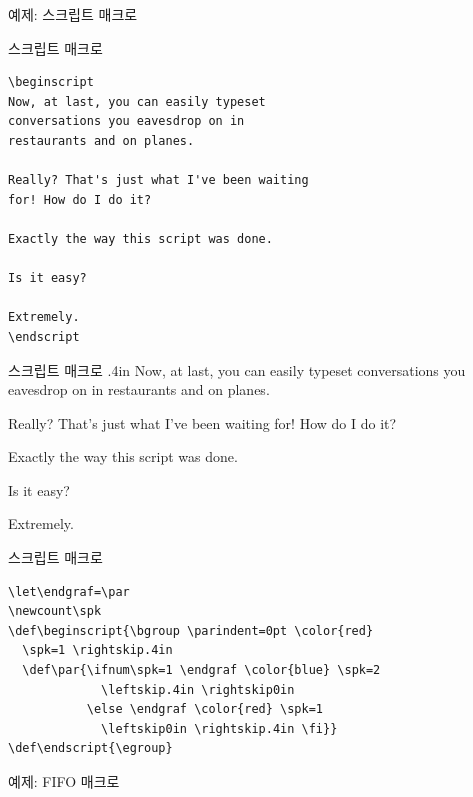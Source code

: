 \documentclass{beamer}
\begin{document}
%
\begin{frame}[standout]
  예제: 스크립트 매크로
\end{frame}


%
\begin{frame}[fragile]{스크립트 매크로}
  \begin{Verbatim}[fontsize=\small]
\beginscript
Now, at last, you can easily typeset
conversations you eavesdrop on in
restaurants and on planes.
  
Really? That's just what I've been waiting
for! How do I do it?
  
Exactly the way this script was done.
  
Is it easy?
  
Extremely.
\endscript
  \end{Verbatim}
\end{frame}


%
\newcount\spk
\def\beginscript{\bgroup \parindent=0pt \color{red} \spk=1 \rightskip.4in
  \def\par{\ifnum\spk=1 \endgraf \color{blue} \spk=2 \leftskip.4in
    \rightskip0in
    \else \endgraf \color{red} \spk=1 \leftskip0in \rightskip.4in \fi}}
\def\endscript {\egroup}

\begin{frame}[fragile]{스크립트 매크로}
  \hsize 3in
  \beginscript
  Now, at last, you can easily typeset
  conversations you eavesdrop on in
  restaurants and on planes.
  
  Really? That's just what I've been waiting
  for! How do I do it?
  
  Exactly the way this script was done.
  
  Is it easy?
  
  Extremely.
  \endscript
\end{frame}


%
\begin{frame}[fragile]{스크립트 매크로}
  \begin{Verbatim}[fontsize=\small]
\let\endgraf=\par
\newcount\spk
\def\beginscript{\bgroup \parindent=0pt \color{red}
  \spk=1 \rightskip.4in
  \def\par{\ifnum\spk=1 \endgraf \color{blue} \spk=2
             \leftskip.4in \rightskip0in
           \else \endgraf \color{red} \spk=1
             \leftskip0in \rightskip.4in \fi}}
\def\endscript{\egroup}
  \end{Verbatim}
\end{frame}


%
\begin{frame}[standout]
  예제: FIFO 매크로
\end{frame}
\end{document}
